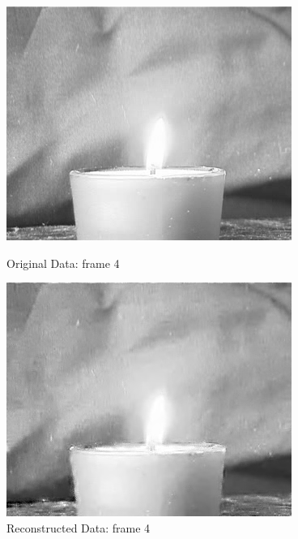 \documentclass[12pt]{article}
\begin{document}
\begin{itemize}
\begin{enumerate}
    \begin{figure}[H]
        \centering
        \begin{minipage}{.45\textwidth}
            \centering
            \includegraphics[width=\linewidth]{results/flame_5_orig_4.png}
            \caption*{Original Data: frame 4}
        \end{minipage}
        \begin{minipage}{.45\textwidth}
            \centering
            \includegraphics[width=\linewidth]{results/flame_5_recon_4.png}
            \caption*{Reconstructed Data: frame 4}
        \end{minipage}
    \end{figure}


\end{enumerate}
\end{itemize}
\end{document}
